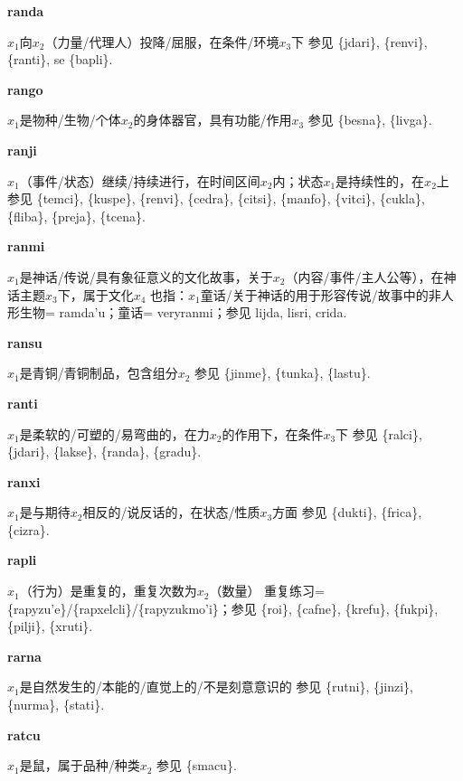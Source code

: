 \documentclass[notitlepage,twocolumn,a4paper,10pt]{book}
\begin{document}
{\sffamily\bfseries randa}\enspace {\ttfamily\bfseries[rad]}  $x_1$向$x_2$（力量\slash{}代理人）投降\slash{}屈服，在条件\slash{}环境$x_3$下 \textemdash{} 参见 \{jdari\}, \{renvi\}, \{ranti\}, se \{bapli\}.

{\sffamily\bfseries rango}\enspace {\ttfamily\bfseries[rag]}  $x_1$是物种\slash{}生物\slash{}个体$x_2$的身体器官，具有功能\slash{}作用$x_3$ \textemdash{} 参见 \{besna\}, \{livga\}.

{\sffamily\bfseries ranji}\enspace {\ttfamily\bfseries[        ra'i]}  $x_1$（事件\slash{}状态）继续\slash{}持续进行，在时间区间$x_2$内；状态$x_1$是持续性的，在$x_2$上 \textemdash{} 参见 \{temci\}, \{kuspe\}, \{renvi\}, \{cedra\}, \{citsi\}, \{manfo\}, \{vitci\}, \{cukla\}, \{fliba\}, \{preja\}, \{tcena\}.

{\sffamily\bfseries ranmi}\enspace {\ttfamily\bfseries[ram]}  $x_1$是神话\slash{}传说\slash{}具有象征意义的文化故事，关于$x_2$（内容\slash{}事件\slash{}主人公等），在神话主题$x_3$下，属于文化$x_4$ \textemdash{} 也指：$x_1$童话\slash{}关于神话的用于形容传说\slash{}故事中的非人形生物= {ramda'u}；童话= {veryranmi}；参见 {lijda}, {lisri}, {crida}.

{\sffamily\bfseries ransu} $x_1$是青铜\slash{}青铜制品，包含组分$x_2$ \textemdash{} 参见 \{jinme\}, \{tunka\}, \{lastu\}.

{\sffamily\bfseries ranti}\enspace {\ttfamily\bfseries[ran]}  $x_1$是柔软的\slash{}可塑的\slash{}易弯曲的，在力$x_2$的作用下，在条件$x_3$下 \textemdash{} 参见 \{ralci\}, \{jdari\}, \{lakse\}, \{randa\}, \{gradu\}.

{\sffamily\bfseries ranxi}\enspace {\ttfamily\bfseries[rax]}  $x_1$是与期待$x_2$相反的\slash{}说反话的，在状态\slash{}性质$x_3$方面 \textemdash{} 参见 \{dukti\}, \{frica\}, \{cizra\}.

{\sffamily\bfseries rapli}\enspace {\ttfamily\bfseries[rap]}  $x_1$（行为）是重复的，重复次数为$x_2$（数量） \textemdash{} 重复练习= \{rapyzu'e\}\slash{}\{rapxelcli\}\slash{}\{rapyzukmo'i\}；参见 \{roi\}, \{cafne\}, \{krefu\}, \{fukpi\}, \{pilji\}, \{xruti\}.

{\sffamily\bfseries rarna}\enspace {\ttfamily\bfseries[rar]}  $x_1$是自然发生的\slash{}本能的\slash{}直觉上的\slash{}不是刻意意识的 \textemdash{} 参见 \{rutni\}, \{jinzi\}, \{nurma\}, \{stati\}.

{\sffamily\bfseries ratcu} $x_1$是鼠，属于品种\slash{}种类$x_2$ \textemdash{} 参见 \{smacu\}.
\end{document}
